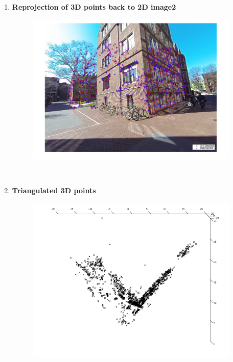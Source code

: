 \documentclass[10pt,letterpaper]{article}
\begin{document}
\begin{enumerate}[1]
\item \textbf{Reprojection of 3D points back to 2D image2}
\begin{figure}[h!]
 \center
  \includegraphics[width=4in]{images/reprojection_image2}
  \caption
   {}
\end{figure} \\

\newpage

\item \textbf{Triangulated 3D points}
\begin{figure}[h!]
 \center
  \includegraphics[width=4in]{images/3D}
  \caption
   {}
\end{figure} \\



\end{enumerate}
\end{document}
